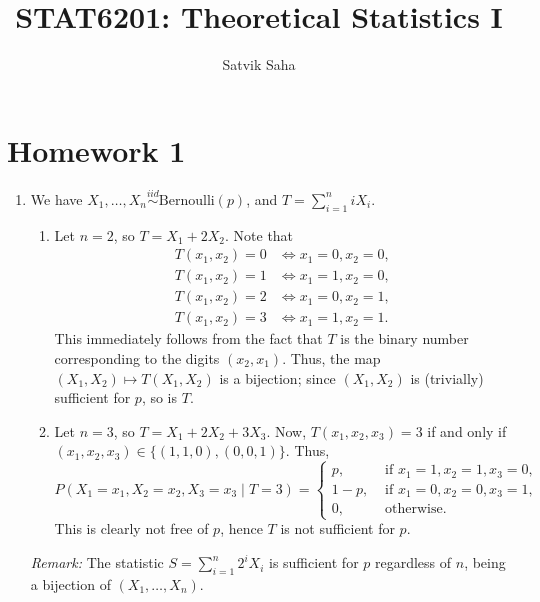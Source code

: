 \documentclass[11pt]{article}
\title{\bfseries STAT6201: Theoretical Statistics I}
\author{Satvik Saha}
\date{}
\begin{document}
    \maketitle

    \section*{Homework 1}

    \begin{enumerate}
        \item We have $X_1, \dots, X_n \overset{iid}{\sim}
        \text{Bernoulli}(p)$, and $T = \sum_{i = 1}^n i X_i$.

        \begin{enumerate}
            \item Let $n = 2$, so $T = X_1 + 2X_2$. Note that \begin{align*}
                T(x_1, x_2) = 0 &\iff x_1 = 0, x_2 = 0, \\
                T(x_1, x_2) = 1 &\iff x_1 = 1, x_2 = 0, \\
                T(x_1, x_2) = 2 &\iff x_1 = 0, x_2 = 1, \\
                T(x_1, x_2) = 3 &\iff x_1 = 1, x_2 = 1.
            \end{align*}
            This immediately follows from the fact that $T$ is the binary
            number corresponding to the digits $(x_2, x_1)$.
            Thus, the map $(X_1, X_2) \mapsto T(X_1, X_2)$ is a bijection;
            since $(X_1, X_2)$ is (trivially) sufficient for $p$, so is $T$.

            \item Let $n = 3$, so $T = X_1 + 2X_2 + 3X_3$. Now, $T(x_1, x_2,
            x_3) = 3$ if and only if $(x_1, x_2, x_3) \in \{(1, 1, 0), (0, 0,
            1)\}$. Thus, \[
                P(X_1 = x_1, X_2 = x_2, X_3 = x_3 \mid T = 3) = \begin{cases}
                    p, &\text{ if } x_1 = 1, x_2 = 1, x_3 = 0, \\
                    1 - p, &\text{ if } x_1 = 0, x_2 = 0, x_3 = 1, \\
                    0, &\text{  otherwise}.
                \end{cases}
            \] This is clearly not free of $p$, hence $T$ is not sufficient
            for $p$.
        \end{enumerate}


        \emph{Remark:} The statistic $S = \sum_{i = 1}^n 2^i X_i$ is
        sufficient for $p$ regardless of $n$, being a bijection of $(X_1,
        \dots, X_n)$.



\end{enumerate}
\end{document}
